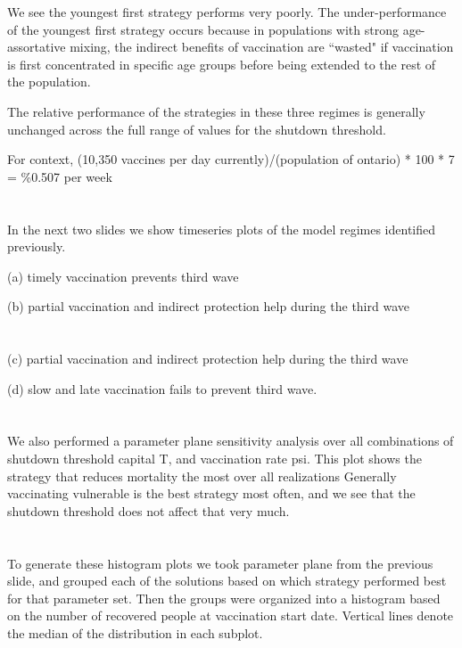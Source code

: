 \documentclass{article}
\begin{document}
We see the youngest first strategy performs very poorly. The under-performance of the youngest first strategy occurs because in populations with strong age-assortative mixing, the indirect benefits of vaccination are “wasted" if vaccination is first concentrated in specific age groups before being extended to the rest of the population.

The relative performance of the strategies in these three regimes is generally unchanged across the full range of values for the shutdown threshold.

For context, 
(10,350 vaccines per day currently)/(population of ontario) * 100 * 7 = \%0.507 per week 

\section{}

In the next two slides we show timeseries plots of the model regimes identified previously.


(a) timely vaccination prevents third wave

(b) partial vaccination and indirect protection help during the third wave

\section[Slide]{}

(c) partial vaccination and indirect protection help during the third wave

(d) slow and late vaccination fails to prevent third wave.

\section{}

We also performed a parameter plane sensitivity analysis over all combinations of shutdown threshold capital T, and vaccination rate psi. This plot shows the strategy that reduces mortality the most over all realizations Generally vaccinating vulnerable is the best strategy most often, and we see that the shutdown threshold does not affect that very much. 

\section{}

To generate these histogram plots we took parameter plane from the previous slide, and grouped each of the solutions based on which strategy performed best for that parameter set. Then the groups were organized into a histogram based on the number of recovered people at vaccination start date. Vertical lines denote the median of the distribution in each subplot.
\end{document}
